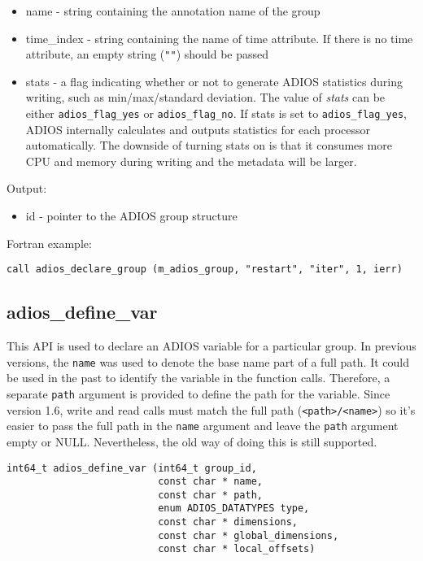 \begin{itemize}
\item name - string containing the annotation name of the group 

\item time\_index - string containing the name of time attribute. If there is no time 
attribute, an empty string (\verb+""+) should be passed

\item stats - a flag indicating whether or not to generate ADIOS statistics during writing, 
such as min/max/standard deviation. The value of \textit{stats} can be either 
\verb+adios_flag_yes+ or \verb+adios_flag_no+. If stats is set to \verb+adios_flag_yes+, 
ADIOS internally calculates and outputs statistics for each processor automatically. 
The downside of turning stats on is that it consumes more CPU and memory during writing 
and the metadata will be larger. 
\end{itemize}

Output: 
\begin{itemize}
\item id - pointer to the ADIOS group structure
\end{itemize}

Fortran example: 
\begin{lstlisting}[alsolanguage=Fortran,caption={},label={}]
call adios_declare_group (m_adios_group, "restart", "iter", 1, ierr)
\end{lstlisting}

\subsection{adios\_define\_var}

This API is used to declare an ADIOS variable for a particular group. In previous versions, the \verb+name+ was used to denote the base name part of a full path. It could be used in the past to identify the variable in the function calls. Therefore, a separate \verb+path+ argument is provided to define the path for the variable. Since version 1.6, write and read calls must match the full path (\verb+<path>/<name>+) so it's easier to pass the full path in the \verb+name+ argument and leave the \verb+path+ argument empty or NULL. Nevertheless, the old way of doing this is still supported.  

\begin{lstlisting}[alsolanguage=C,caption={},label={}]
int64_t adios_define_var (int64_t group_id, 
                          const char * name,
                          const char * path,
                          enum ADIOS_DATATYPES type,
                          const char * dimensions,
                          const char * global_dimensions,
                          const char * local_offsets)
\end{lstlisting}

